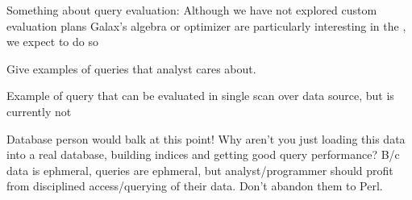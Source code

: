 Something about query evaluation:
Although we have not explored custom evaluation plans 
Galax's algebra or optimizer are particularly interesting in the 
\padx{}, we expect to do so 

Give examples of queries that analyst cares about. 

Example of query that can be evaluated in single scan over data
source, but is currently not 

Database person would balk at this point!  Why aren't you just loading
this data into a real database, building indices and getting good
query performance?  B/c data is ephmeral, queries are ephmeral, but
analyst/programmer should profit from disciplined access/querying of
their data.  Don't abandon them to Perl. 
